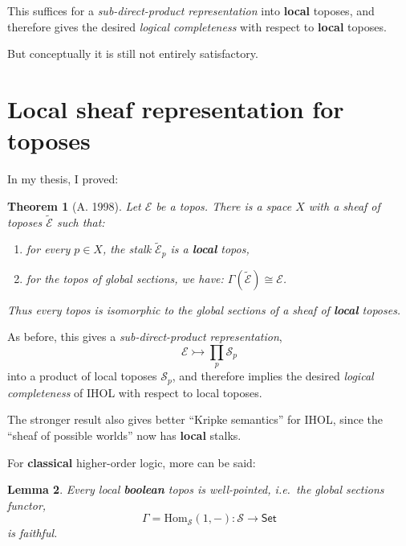 \documentclass[11pt]{article}
\newcommand{\E}{\ensuremath{\mathcal{E}}}
\newcommand{\Set}{\ensuremath{\mathsf{Set}}}
\renewcommand{\hom}{\ensuremath{\mathrm{Hom}}}
\newtheorem{theorem}{Theorem}
\newtheorem{lemma}[theorem]{Lemma}
\theoremstyle{remark}
\theoremstyle{definition}
\newcommand{\myemph}[1]{\textbf{#1}}
\begin{document}
This suffices for a \emph{sub-direct-product representation} into \myemph{local} toposes, and therefore gives the desired \emph{logical completeness} with respect to \myemph{local} toposes.  

But conceptually it is still not entirely satisfactory.

\section{Local sheaf representation for toposes}

In my thesis, I proved:

\begin{theorem}[A. 1998]
Let $\E$ be a topos.  
There is a space $X$ with a sheaf of toposes $\tilde{\E}$ such that:
\begin{enumerate}
\item for every $p\in X$, the stalk $\tilde{\E}_p$ is a \myemph{local} topos, 
\item for the topos of global sections, we have: $\Gamma(\tilde{\E}) \cong \E$.
\end{enumerate}
Thus every topos is isomorphic to the global sections of a sheaf of \myemph{local} toposes.  
\end{theorem}
\medskip

As before, this gives a \emph{sub-direct-product representation},
\[
\E \rightarrowtail \prod_{p}\mathcal{S}_p
\]
into a product of local toposes $\mathcal{S}_p$, and therefore implies the desired \emph{logical completeness} of IHOL with respect to local toposes.  

The stronger result also gives better ``Kripke semantics'' for IHOL, since the ``sheaf of possible worlds'' now has \myemph{local} stalks.
\medskip

For \myemph{classical} higher-order logic, more can be said:

\begin{lemma}
Every local \myemph{boolean} topos is well-pointed, i.e.\ the global sections functor,
\[
\Gamma = \hom_\mathcal{S}(1, - ) : \mathcal{S} \to \Set
\]
is faithful.
\end{lemma}
\end{document}
